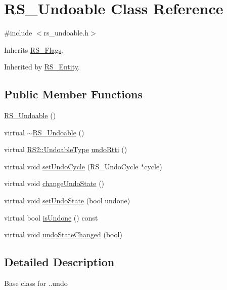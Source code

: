 \hypertarget{class_r_s___undoable}{\section{R\-S\-\_\-\-Undoable Class Reference}
\label{class_r_s___undoable}
}


{\ttfamily \#include $<$rs\-\_\-undoable.\-h$>$}



Inherits \hyperlink{class_r_s___flags}{R\-S\-\_\-\-Flags}.



Inherited by \hyperlink{class_r_s___entity}{R\-S\-\_\-\-Entity}.

\subsection*{Public Member Functions}
\begin{DoxyCompactItemize}
\item 
\hyperlink{class_r_s___undoable_a6c18486e7d9835d1f01c40159b65589d}{R\-S\-\_\-\-Undoable} ()
\item 
virtual \hyperlink{class_r_s___undoable_a37727789aeb07a6f4f61487a4b2ec739}{$\sim$\-R\-S\-\_\-\-Undoable} ()
\item 
virtual \hyperlink{class_r_s2_ab5fe5e99761abbb178f2e132d4ac84ee}{R\-S2\-::\-Undoable\-Type} \hyperlink{class_r_s___undoable_a82cbb94a22101e252be773b1f60630b3}{undo\-Rtti} ()
\item 
virtual void \hyperlink{class_r_s___undoable_a065b9e6b278d98bc2db514f3350635e1}{set\-Undo\-Cycle} (R\-S\-\_\-\-Undo\-Cycle $\ast$cycle)
\item 
virtual void \hyperlink{class_r_s___undoable_a9d37766eb3b0247996af4308a0738f7b}{change\-Undo\-State} ()
\item 
virtual void \hyperlink{class_r_s___undoable_a6785aba9c32556f82313155a563d78fd}{set\-Undo\-State} (bool undone)
\item 
virtual bool \hyperlink{class_r_s___undoable_ad8efde7e2cf8c199383ac8cf22b120fa}{is\-Undone} () const 
\item 
virtual void \hyperlink{class_r_s___undoable_a8db54f4812aafa6772ddd375a66e21bb}{undo\-State\-Changed} (bool)
\end{DoxyCompactItemize}


\subsection{Detailed Description}
Base class for ..undo 

